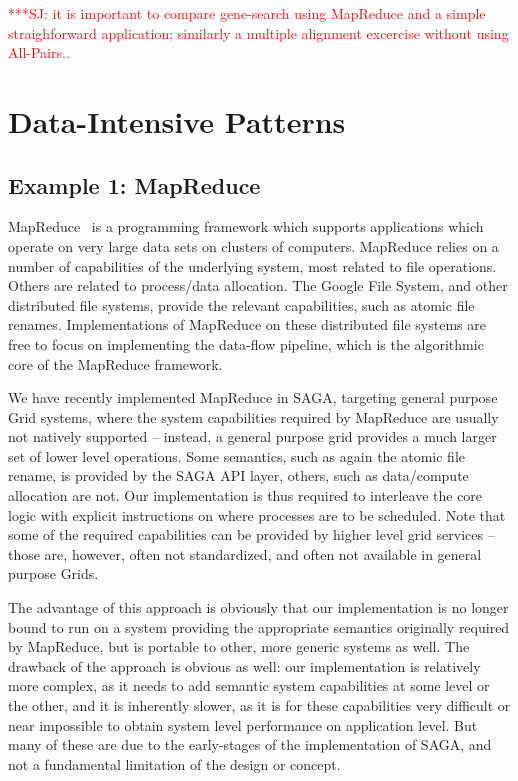 \documentclass[conference,final]{IEEEtran}
\newcommand{\jhanote}[1]{ {\textcolor{red} { ***SJ: #1 }}}
\newcommand{\jhanote}[1]{}
\begin{document}
\jhanote{it is important to compare gene-search using MapReduce and a
  simple straighforward application; similarly a multiple
  alignment excercise without using All-Pairs..}

\section{Data-Intensive Patterns}

\subsection{Example 1: MapReduce}

MapReduce~\cite{mapreduce-paper} is a programming framework which
supports applications which operate on very large data sets on
clusters of computers.  MapReduce relies on a number of capabilities
of the underlying system, most related to file operations.  Others are 
related to process/data allocation.  The Google File System, and other
distributed file systems, provide the relevant capabilities, such as atomic
file renames.  Implementations of MapReduce on these distributed file systems
are free to focus on implementing the data-flow pipeline, which is the
algorithmic core of the MapReduce framework.

We have recently implemented MapReduce in SAGA, targeting general
purpose Grid systems, where the system capabilities required by
MapReduce are usually not natively supported -- instead, a general
purpose grid provides a much larger set of lower level operations.
Some semantics, such as again the atomic file rename, is provided by
the SAGA API layer, others, such as data/compute allocation are not.
Our implementation is thus required to interleave the core logic with
explicit instructions on where processes are to be scheduled.  Note that
some of the required capabilities can be provided by higher level grid
services -- those are, however, often not standardized, and often not
available in general purpose Grids.

The advantage of this approach is obviously that our implementation is
no longer bound to run on a system providing the appropriate semantics
originally required by MapReduce, but is portable to other, more
generic systems as well.  The drawback of the approach is obvious as
well: our implementation is relatively more complex, as it needs to
add semantic system capabilities at some level or the other, and it is
inherently slower, as it is for these capabilities very difficult or
near impossible to obtain system level performance on application
level.  But many of these are due to the early-stages of the
implementation of SAGA, and not a fundamental limitation of the design
or concept.
\end{document}
